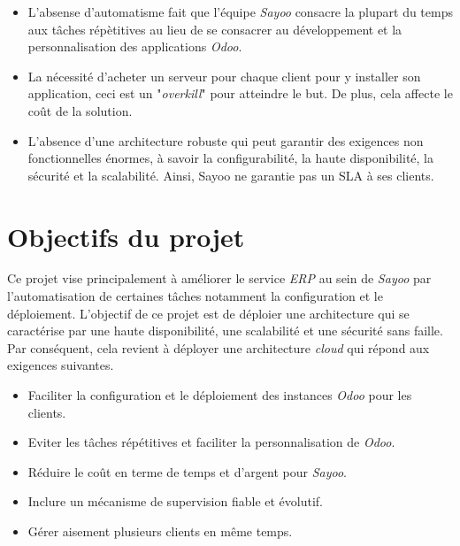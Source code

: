 \begin{onehalfspace}
\begin{itemize}
\item L'absense d'automatisme fait que l'équipe \emph{Sayoo} consacre la plupart du temps aux tâches répètitives au lieu de se consacrer au développement et la personnalisation des applications \emph{Odoo}. 

\item La nécessité d'acheter un serveur pour chaque client pour y installer son application, ceci est un "\emph{overkill}" pour atteindre le but. De plus, cela affecte le coût de la solution.

\item L'absence d'une architecture robuste qui peut garantir des exigences non fonctionnelles énormes, à savoir la configurabilité, la haute disponibilité, la sécurité et la scalabilité. Ainsi, Sayoo ne garantie pas un SLA à ses clients.

\end{itemize}




\section{Objectifs du projet}
Ce projet vise principalement à améliorer le service \emph{ERP} au sein de \emph{Sayoo} par l'automatisation de certaines tâches notamment la configuration et le déploiement. L'objectif de ce projet est de déploier une architecture qui se caractérise par une haute disponibilité, une scalabilité et une sécurité sans faille. Par conséquent, cela revient à déployer une architecture \emph{cloud} qui répond aux exigences suivantes.
\begin{itemize}

\item Faciliter la configuration et le déploiement des instances \emph{Odoo} pour les clients.

\item Eviter les tâches répétitives et faciliter la personnalisation de \emph{Odoo}.

\item Réduire le coût en terme de temps et d'argent pour \emph{Sayoo}.

\item Inclure un mécanisme de supervision fiable et évolutif.

\item Gérer aisement plusieurs clients en même temps.  
 
 \end{itemize}







\end{onehalfspace}
